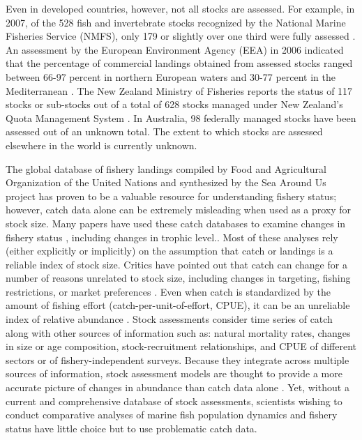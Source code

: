 \documentclass[letterpaper,12pt]{article}
\begin{document}
Even in developed countries, however, not all stocks are assessed.
For example, in 2007, of the 528 fish and invertebrate stocks
recognized by the National Marine Fisheries Service (NMFS), only 179
or slightly over one third were fully assessed \citep{NMFS:2008:status}.  An
assessment by the European Environment Agency (EEA) in 2006 indicated
that the percentage of commercial landings obtained from assessed
stocks ranged between 66-97 percent in northern European waters and
30-77 percent in the Mediterranean \citep{eea:2009:status}.  The New Zealand
Ministry of Fisheries reports the status of 117 stocks or sub-stocks
out of a total of 628 stocks managed under New Zealand's Quota
Management System \citep{NZMF:2009}.  In Australia, 98 federally managed
stocks have been assessed \citep{Wilson:etal:2009:status} out of an unknown
total. The extent to which stocks are assessed elsewhere in the world
is currently unknown.

The global database of fishery landings compiled by Food and
Agricultural Organization of the United Nations \citep{FAO:fishstat}
and synthesized by the Sea Around Us project
\citep{Watson:etal:2005:fandf} has proven to be a valuable resource
for understanding fishery status; however, catch data alone can be
extremely misleading when used as a proxy for stock size.  Many papers
have used these catch databases to examine changes in fishery status
\citep{Worm:etal:2006:science}, including changes in trophic
level.\citep{Pauly:etal:1998, Essington:etal:2006:procnatacadsci,
  Newton:etal:2007:currentbiol}.  Most of these analyses rely (either
explicitly or implicitly) on the assumption that catch or landings is
a reliable index of stock size.  Critics have pointed out that catch
can change for a number of reasons unrelated to stock size, including
changes in targeting, fishing restrictions, or market preferences
\citep{deMutsert:etal:2008:pnas, Murawski:Methot:Tromble:2007:science,Murawski:Methot:Tromble:2007:science, Hilborn:2007:science}.  Even when catch is standardized by the
amount of fishing effort (catch-per-unit-of-effort, CPUE), it can be
an unreliable index of relative abundance
\citep{Hutchings:Myers:1994:cjfas, Harley:etal:2001:cjfas,
  Walters:2003:cjfas, Polacheck:2006:marpol}.  Stock assessments
consider time series of catch along with other sources of information
such as: natural mortality rates, changes in size or age composition,
stock-recruitment relationships, and CPUE of different sectors or of
fishery-independent surveys.  Because they integrate across multiple
sources of information, stock assessment models are thought to provide
a more accurate picture of changes in abundance than catch data alone
\citep{Sibert:etal:2006:science}. Yet, without a current and comprehensive
database of stock assessments, scientists wishing to conduct
comparative analyses of marine fish population dynamics and fishery
status have little choice but to use problematic catch data.
\end{document}
